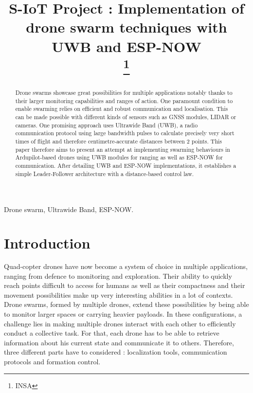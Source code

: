 \documentclass[conference]{IEEEtran}
\begin{document}
\title{S-IoT Project : Implementation of drone swarm techniques with UWB and ESP-NOW \\
{}
\thanks{INSA}
}

\author{
\and
{}
}

\maketitle

\begin{abstract}
Drone swarms showcase great possibilities for multiple applications notably thanks to their larger monitoring capabilities and ranges of action. One paramount condition to enable swarming relies on efficient and robust communication and localisation. This can be made possible with different kinds of sensors such as GNSS modules, LIDAR or cameras. One promising approach uses Ultrawide Band (UWB), a radio communication protocol using large bandwidth pulses to calculate precisely very short times of flight and therefore centimetre-accurate distances between 2 points. This paper therefore aims to present an attempt at implementing swarming behaviours in Ardupilot-based drones using UWB modules for ranging as well as ESP-NOW for communication. After detailing UWB and ESP-NOW implementations, it establishes a simple Leader-Follower architecture with a distance-based control law. 
\end{abstract}

\begin{IEEEkeywords}
Drone swarm, Ultrawide Band, ESP-NOW.
\end{IEEEkeywords}

\section{Introduction}

Quad-copter drones have now become a system of choice in multiple applications, ranging from defence to monitoring and exploration. Their ability to quickly reach points difficult to access for humans as well as their compactness and their movement possibilities make up very interesting abilities in a lot of contexts. Drone swarms, formed by multiple drones, extend these possibilities by being able to monitor larger spaces or carrying heavier payloads. In these configurations, a challenge lies in making multiple drones interact with each other to efficiently conduct a collective task. For that, each drone has to be able to retrieve information about his current state and communicate it to others. Therefore, three different parts have to considered : localization tools, communication protocols and formation control.
\end{document}
